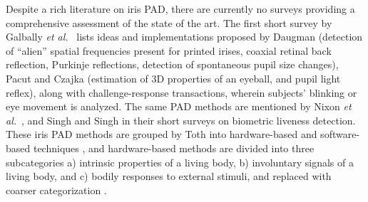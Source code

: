 \documentclass[format=acmsmall, review=false, timestamp=false]{acmart}
\newcommand{\etal}{{\it et al.}~}
\begin{document}
Despite a rich literature on iris PAD, there are currently no surveys providing a comprehensive assessment of the state of the art. The first short survey by Galbally \etal \cite{Galbally_SWB_2007} lists ideas and implementations proposed by Daugman (detection of ``alien'' spatial frequencies present for printed irises, coaxial retinal back reflection, Purkinje reflections, detection of spontaneous pupil size changes), Pacut and Czajka (estimation of 3D properties of an eyeball, and pupil light reflex), along with challenge-response transactions, wherein subjects' blinking or eye movement is analyzed. The same PAD methods are mentioned by Nixon \etal \cite{Nixon_HoB_2008}, and Singh and Singh \cite{Singh_ICT_2011} in their short surveys on biometric liveness detection. {These iris PAD methods are grouped by Toth into hardware-based and software-based techniques \cite{Toth_EB_2015}, and hardware-based methods are divided into three subcategories a) intrinsic properties of a living body, b) involuntary signals of a living body, and c) bodily responses to external stimuli, and replaced with coarser categorization \cite{Toth_EB_2009}.}
\end{document}
